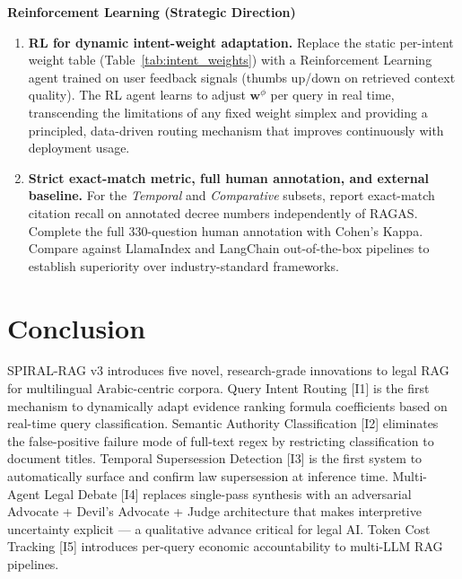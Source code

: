 \documentclass[12pt,a4paper]{article}
\begin{document}
\vspace{6pt}
\noindent\textbf{Reinforcement Learning (Strategic Direction)}
\begin{enumerate}[leftmargin=*,nosep,resume]

\item \textbf{RL for dynamic intent-weight adaptation.}
Replace the static per-intent weight table (Table~\ref{tab:intent_weights}) with
a Reinforcement Learning agent trained on user feedback signals (thumbs up/down on
retrieved context quality). The RL agent learns to adjust $\mathbf{w}^\phi$ per
query in real time, transcending the limitations of any fixed weight simplex and
providing a principled, data-driven routing mechanism that improves continuously
with deployment usage.

\item \textbf{Strict exact-match metric, full human annotation, and external baseline.}
For the \emph{Temporal} and \emph{Comparative} subsets, report exact-match citation
recall on annotated decree numbers independently of RAGAS. Complete the full
330-question human annotation with Cohen's Kappa. Compare against LlamaIndex and
LangChain out-of-the-box pipelines to establish superiority over industry-standard
frameworks.

\end{enumerate}

\section{Conclusion}
\label{sec:conclusion}

SPIRAL-RAG v3 introduces five novel, research-grade innovations to legal RAG
for multilingual Arabic-centric corpora. Query Intent Routing [I1] is the first
mechanism to dynamically adapt evidence ranking formula coefficients based on
real-time query classification. Semantic Authority Classification [I2] eliminates
the false-positive failure mode of full-text regex by restricting classification to
document titles. Temporal Supersession Detection [I3] is the first system to
automatically surface and confirm law supersession at inference time. Multi-Agent
Legal Debate [I4] replaces single-pass synthesis with an adversarial Advocate +
Devil's Advocate + Judge architecture that makes interpretive uncertainty explicit —
a qualitative advance critical for legal AI. Token Cost Tracking [I5] introduces
per-query economic accountability to multi-LLM RAG pipelines.
\end{document}
